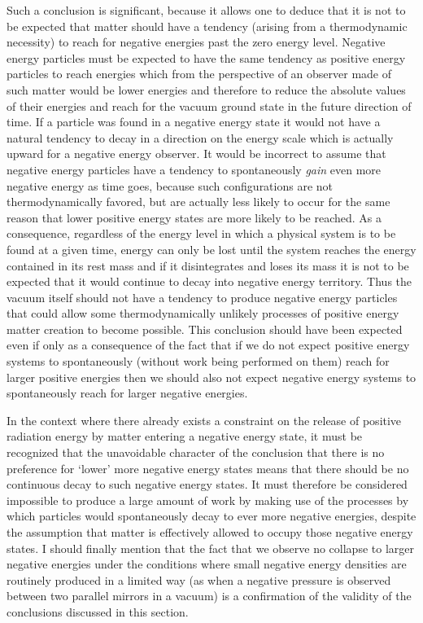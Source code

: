 \documentclass[notitlepage,12pt]{report}
\begin{document}
Such a conclusion is significant, because it allows one to deduce that it is not to be expected that matter should have a tendency (arising from a thermodynamic necessity) to reach for negative energies past the zero energy level. Negative energy particles must be expected to have the same tendency as positive energy particles to reach energies which from the perspective of an observer made of such matter would be lower energies and therefore to reduce the absolute values of their energies and reach for the vacuum ground state in the future direction of time. If a particle was found in a negative energy state it would not have a natural tendency to decay in a direction on the energy scale which is actually upward for a negative energy observer. It would be incorrect to assume that negative energy particles have a tendency to spontaneously \textit{gain} even more negative energy as time goes, because such configurations are not thermodynamically favored, but are actually less likely to occur for the same reason that lower positive energy states are more likely to be reached. As a consequence, regardless of the energy level in which a physical system is to be found at a given time, energy can only be lost until the system reaches the energy contained in its rest mass and if it disintegrates and loses its mass it is not to be expected that it would continue to decay into negative energy territory. Thus the vacuum itself should not have a tendency to produce negative energy particles that could allow some thermodynamically unlikely processes of positive energy matter creation to become possible. This conclusion should have been expected even if only as a consequence of the fact that if we do not expect positive energy systems to spontaneously (without work being performed on them) reach for larger positive energies then we should also not expect negative energy systems to spontaneously reach for larger negative energies.

In the context where there already exists a constraint on the release of positive radiation energy by matter entering a negative energy state, it must be recognized that the unavoidable character of the conclusion that there is no preference for `lower' more negative energy states means that there should be no continuous decay to such negative energy states. It must therefore be considered impossible to produce a large amount of work by making use of the processes by which particles would spontaneously decay to ever more negative energies, despite the assumption that matter is effectively allowed to occupy those negative energy states. I should finally mention that the fact that we observe no collapse to larger negative energies under the conditions where small negative energy densities are routinely produced in a limited way (as when a negative pressure is observed between two parallel mirrors in a vacuum) is a confirmation of the validity of the conclusions discussed in this section.
\end{document}
